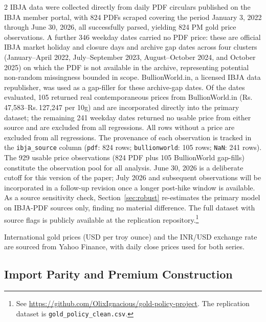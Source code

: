 \documentclass[12pt]{article}
\begin{document}
\begin{multicols}{2}
IBJA data were collected directly from daily PDF circulars published on the IBJA member portal, with 824 PDFs scraped covering the period January 3, 2022 through June 30, 2026, all successfully parsed, yielding 824 PM gold price observations. A further 346 weekday dates carried no PDF price: these are official IBJA market holiday and closure days and archive gap dates across four clusters (January--April 2022, July--September 2023, August--October 2024, and October 2025) on which the PDF is not available in the archive, representing potential non-random missingness bounded in scope. BullionWorld.in, a licensed IBJA data republisher, was used as a gap-filler for these archive-gap dates. Of the dates evaluated, 105 returned real contemporaneous prices from BullionWorld.in (Rs.\,47,583--Rs.\,127,247 per 10g) and are incorporated directly into the primary dataset; the remaining 241 weekday dates returned no usable price from either source and are excluded from all regressions. All rows without a price are excluded from all regressions. The provenance of each observation is tracked in the \texttt{ibja\_source} column (\texttt{pdf}: 824 rows; \texttt{bullionworld}: 105 rows; \texttt{NaN}: 241 rows). The 929 usable price observations (824 PDF plus 105 BullionWorld gap-fills) constitute the observation pool for all analysis. June 30, 2026 is a deliberate cutoff for this version of the paper; July 2026 and subsequent observations will be incorporated in a follow-up revision once a longer post-hike window is available. As a source sensitivity check, Section~\ref{sec:robust} re-estimates the primary model on IBJA-PDF sources only, finding no material difference. The full dataset with source flags is publicly available at the replication repository.\footnote{See \url{https://github.com/OlixIgnacious/gold-policy-project}. The replication dataset is \texttt{gold\_policy\_clean.csv}.}

International gold prices (USD per troy ounce) and the INR/USD exchange rate are sourced from Yahoo Finance, with daily close prices used for both series.

\subsection*{Import Parity and Premium Construction}


\end{multicols}
\end{document}
